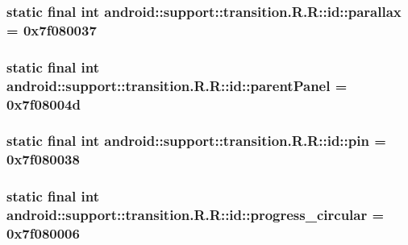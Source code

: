 \hypertarget{classandroid_1_1support_1_1transition_1_1_r_1_1id_bc29cb85fd366e24d9e16c6bc5f5cda6}{
\subsubsection[{parallax}]{\setlength{\rightskip}{0pt plus 5cm}static final int android::support::transition.R.R::id::parallax = 0x7f080037}}
\label{classandroid_1_1support_1_1transition_1_1_r_1_1id_bc29cb85fd366e24d9e16c6bc5f5cda6}


\hypertarget{classandroid_1_1support_1_1transition_1_1_r_1_1id_f9a30c732b37d17e6c7af084d8ee21e4}{
\subsubsection[{parentPanel}]{\setlength{\rightskip}{0pt plus 5cm}static final int android::support::transition.R.R::id::parentPanel = 0x7f08004d}}
\label{classandroid_1_1support_1_1transition_1_1_r_1_1id_f9a30c732b37d17e6c7af084d8ee21e4}


\hypertarget{classandroid_1_1support_1_1transition_1_1_r_1_1id_2c389d8115fb2e81f384f6c0e215a8e6}{
\subsubsection[{pin}]{\setlength{\rightskip}{0pt plus 5cm}static final int android::support::transition.R.R::id::pin = 0x7f080038}}
\label{classandroid_1_1support_1_1transition_1_1_r_1_1id_2c389d8115fb2e81f384f6c0e215a8e6}


\hypertarget{classandroid_1_1support_1_1transition_1_1_r_1_1id_21fbb12e59217fdbc6d181345bc83f5f}{
\subsubsection[{progress\_\-circular}]{\setlength{\rightskip}{0pt plus 5cm}static final int android::support::transition.R.R::id::progress\_\-circular = 0x7f080006}}
\label{classandroid_1_1support_1_1transition_1_1_r_1_1id_21fbb12e59217fdbc6d181345bc83f5f}


